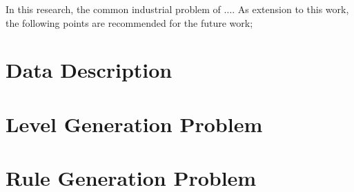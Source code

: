 In this research, the common industrial problem of $\ldots$. As extension to this work, the following points are recommended for the future work;

\section{Data Description}
\section{Level Generation Problem}
\section{Rule Generation Problem}
